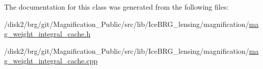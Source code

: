 The documentation for this class was generated from the following files\-:\begin{DoxyCompactItemize}
\item 
/disk2/brg/git/\-Magnification\-\_\-\-Public/src/lib/\-Ice\-B\-R\-G\-\_\-lensing/magnification/\hyperlink{mag__weight__integral__cache_8h}{mag\-\_\-weight\-\_\-integral\-\_\-cache.\-h}\item 
/disk2/brg/git/\-Magnification\-\_\-\-Public/src/lib/\-Ice\-B\-R\-G\-\_\-lensing/magnification/\hyperlink{mag__weight__integral__cache_8cpp}{mag\-\_\-weight\-\_\-integral\-\_\-cache.\-cpp}\end{DoxyCompactItemize}
